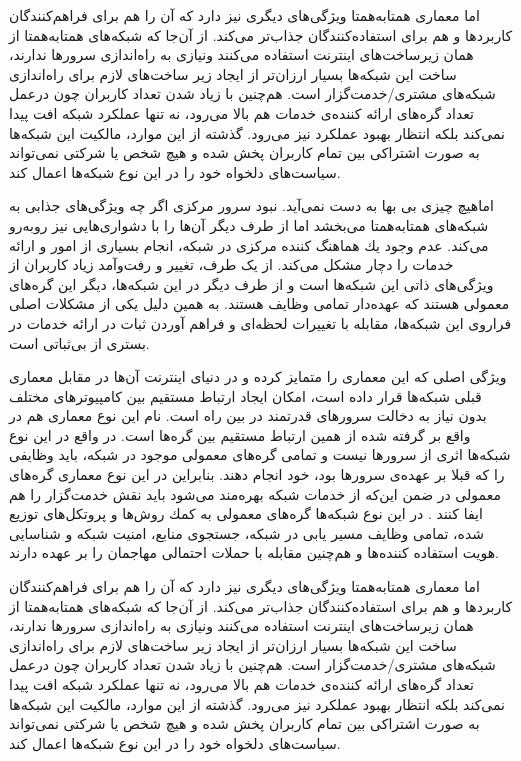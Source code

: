 \documentclass[12pt,twoside]{xepersian-magazine}
\begin{document}
\begin{article}{1}
اما معماری همتابه‌همتا ويژگی‌های ديگری نيز دارد که آن را هم برای فراهم‌کنندگان کاربردها و هم برای استفاده‌کنندگان جذاب‌تر می‌کند.  از آن‌جا که شبکه‌های همتابه‌همتا از همان زيرساخت‌های اينترنت استفاده می‌کنند ونيازی به راه‌اندازی سرورها ندارند، ساخت اين شبكه‌ها بسيار ارزان‌تر از ايجاد زير ساخت‌های لازم برای راه‌اندازی شبكه‌های مشتری/خدمت‌گزار است.  هم‌چنين با زياد شدن تعداد کاربران چون درعمل تعداد گره‌های ارائه کننده‌ی خدمات هم بالا می‌رود، نه تنها عملكرد شبكه افت پيدا نمی‌كند بلكه انتظار بهبود عملکرد نيز می‌رود. گذشته از اين موارد، مالكيت اين شبكه‌ها به صورت اشتراكی بين تمام کاربران پخش شده و هيچ شخص يا شركتی نمی‌تواند سياست‌های دلخواه خود را در اين نوع شبكه‌ها اعمال کند.

اماهيچ چيزی بی‌ بها به دست نمی‌آید. نبود سرور مرکزی اگر چه  ويژگی‌های جذابی به شبکه‌های همتابه‌همتا می‌بخشد اما از طرف ديگر آن‌ها را با دشواری‌هايی نيز روبه‌رو می‌کند.  عدم وجود يك هماهنگ كننده مركزی در شبكه، انجام بسياری از امور و ارائه خدمات را  دچار مشكل می‌کند.  از يک طرف، تغيير و رفت‌وآمد زیاد کاربران از ويژگی‌های ذاتی اين شبکه‌ها است و از طرف ديگر در اين شبكه‌ها، ديگر اين گره‌های معمولی  هستند كه  عهده‌دار تمامی وظايف هستند. به همين دلیل يکی از مشکلات اصلی فراروی اين شبكه‌ها، مقابله با  تغييرات لحظه‌ای و فراهم آوردن ثبات در ارائه  خدمات در بستری از بی‌ثباتی است.  


ويژگی اصلی که اين معماری را متمايز کرده و در دنيای اينترنت آن‌ها در مقابل معماری قبلی شبكه‌ها قرار داده است، امكان ايجاد ارتباط مستقيم  بين كامپيوترهای مختلف بدون نياز به دخالت سرورهای قدرتمند در بين راه است.  نام‌ اين نوع معماری هم در واقع بر گرفته شده از همین  ارتباط مستقیم بين گره‌ها است.  در واقع در اين نوع شبكه‌ها اثری از سرورها نيست و تمامی گره‌های معمولی موجود در شبكه، بايد وظايفی را که قبلا بر عهده‌ی سرورها بود، خود انجام دهند. بنابراين در اين نوع معماری گره‌های معمولی در ضمن اين‌که از خدمات شبکه بهره‌مند می‌شود بايد نقش خدمت‌گزار را هم ايفا کنند . در اين نوع شبکه‌ها گره‌های معمولی به كمك روش‌ها و پروتكل‌های توزيع شده، تمامی وظايف  مسير يابی در شبكه، جستجوی منابع، امنيت شبكه و شناسايی هويت استفاده كننده‌ها و هم‌چنين مقابله با حملات احتمالی مهاجمان را بر عهده دارند.

اما معماری همتابه‌همتا ويژگی‌های ديگری نيز دارد که آن را هم برای فراهم‌کنندگان کاربردها و هم برای استفاده‌کنندگان جذاب‌تر می‌کند.  از آن‌جا که شبکه‌های همتابه‌همتا از همان زيرساخت‌های اينترنت استفاده می‌کنند ونيازی به راه‌اندازی سرورها ندارند، ساخت اين شبكه‌ها بسيار ارزان‌تر از ايجاد زير ساخت‌های لازم برای راه‌اندازی شبكه‌های مشتری/خدمت‌گزار است.  هم‌چنين با زياد شدن تعداد کاربران چون درعمل تعداد گره‌های ارائه کننده‌ی خدمات هم بالا می‌رود، نه تنها عملكرد شبكه افت پيدا نمی‌كند بلكه انتظار بهبود عملکرد نيز می‌رود. گذشته از اين موارد، مالكيت اين شبكه‌ها به صورت اشتراكی بين تمام کاربران پخش شده و هيچ شخص يا شركتی نمی‌تواند سياست‌های دلخواه خود را در اين نوع شبكه‌ها اعمال کند.


\end{article}
\end{document}
